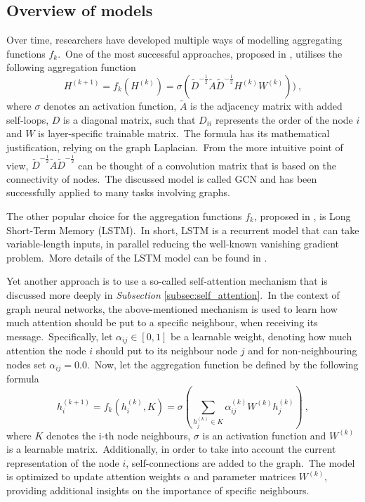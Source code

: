 \documentclass[longabstract, english, mgr]{iithesis}
\theoremstyle{default_theorem_style}\newtheorem{theorem}{Theorem}
\theoremstyle{default_theorem_style}\newtheorem{definition}{Definition}
\begin{document}
\subsection{Overview of models}

Over time, researchers have developed multiple ways of modelling aggregating functions $f_k$.\ One of the most
successful approaches, proposed in \cite{gcn_model}, utilises the following aggregation function
$$
H^{(k + 1)} = f_k(H^{(k)}) = \sigma(\tilde{D}^{-\frac{1}{2}} \tilde{A} \tilde{D}^{-\frac{1}{2}} H^{(k)} W^{(k)}))\ ,
$$
where $\sigma$ denotes an activation function, $\tilde{A}$ is the adjacency matrix with added self-loops, $D$ is
a diagonal matrix, such that $D_{ii}$ represents the order of the node $i$ and $W$ is layer-specific trainable
matrix.\ The formula has its mathematical justification, relying on the graph Laplacian.\ From the more intuitive
point of view, $\tilde{D}^{-\frac{1}{2}} \tilde{A} \tilde{D}^{-\frac{1}{2}}$ can be thought of a convolution matrix
that is based on the connectivity of nodes.\ The discussed model is called GCN and has been successfully applied
to many tasks involving graphs.\newline

\noindent The other popular choice for the aggregation functions $f_k$, proposed in \cite{graphsage}, is
Long Short-Term Memory (LSTM).\ In short, LSTM is a recurrent model that can take variable-length
inputs, in parallel reducing the well-known vanishing gradient problem.\ More details of the LSTM model can be found
in \cite{goodfellow_book}.\newline

\noindent Yet another approach is to use a so-called self-attention mechanism that is discussed more deeply in
\textit{Subsection} \ref{subsec:self_attention}.\ In the context of graph neural networks, the above-mentioned
mechanism is used to learn how much attention should be put to a specific neighbour, when receiving its
message.\ Specifically, let $\alpha_{ij} \in [0, 1]$ be a learnable weight, denoting how much attention the node
$i$ should put to its neighbour node $j$ and for non-neighbouring nodes set $\alpha_{ij} = 0.0$.\ Now, let the
aggregation function be defined by the following formula
$$
h_i^{(k + 1)} = f_k(h_i^{(k)}, K) = \sigma(\sum_{h_j^{(k)} \in K} \alpha_{ij}^{(k)} W^{(k)} h_j^{(k)})\ ,
$$
where $K$ denotes the i-th node neighbours, $\sigma$ is an activation function and $W^{(k)}$ is a learnable
matrix.\ Additionally, in order to take into account the current representation of the node $i$, self-connections
are added to the graph.\ The model is optimized to update attention weights $\alpha$ and parameter matrices
$W^{(k)}$, providing additional insights on the importance of specific neighbours.\newline
\end{document}

